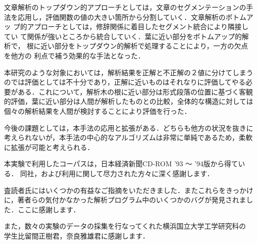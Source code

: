 文章解析のトップダウン的アプローチとしては，文章のセグメンテーションの手
法を応用し，評価関数の値の大きい箇所から分割していく．文章解析のボトムアッ
プ的アプローチとしては，修辞関係に着目したセグメント統合により隣接してい
て関係が強いところから統合していく．葉に近い部分をボトムアップ的解析で，
根に近い部分をトップダウン的解析で処理することにより，一方の欠点を他方の
利点で補う効果的な手法となった．

本研究のような対象においては，解析結果を正解と不正解の２値に分けてしまう
のでは評価としては不十分であり，正解に近いものはそれなりに評価してやる必
要がある．これについて，解析木の根に近い部分は形式段落の位置に基づく客観
的評価，葉に近い部分は人間が解析したものとの比較，全体的な構造に対しては
個々の解析結果を人間が検討することにより評価を行った．

今後の課題としては，本手法の応用と拡張がある．どちらも他方の状況を抜きに
考えられないが，本手法の中心的なアルゴリズムは非常に単純であるため，柔軟
に拡張が可能と考えられる．

\acknowledgment

本実験で利用したコーパスは，日本経済新聞CD-ROM '93 〜 '94版から得ている．
同社，および利用に関して尽力された方々に深く感謝します．

査読者氏にはいくつかの有益なご指摘をいただきました．またこれらをきっかけ
に，著者らの気付かなかった解析プログラム中のいくつかのバグが発見されまし
た．ここに感謝します．

また，数々の実験のデータの採集を行なってくれた横浜国立大学工学研究科の
学生比留間正樹君，奈良雅雄君に感謝します．


\nocite{Wada:97}
\nocite{Hiruma:97}
\nocite{Tamura:97}



\vspace{-8mm}
\begin{biography}


\end{biography}

